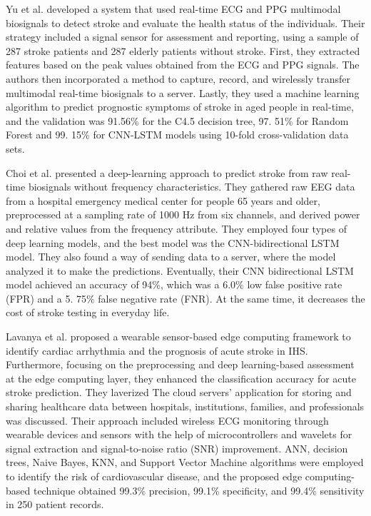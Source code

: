 \documentclass[conference]{IEEEtran}
\begin{document}
Yu et al. \cite{yu2022ai} developed a system that used real-time ECG and PPG multimodal biosignals to detect stroke and evaluate the health status of the individuals. Their strategy included a signal sensor for assessment and reporting, using a sample of 287 stroke patients and 287 elderly patients without stroke. First, they extracted features based on the peak values obtained from the ECG and PPG signals. The authors then incorporated a method to capture, record, and wirelessly transfer multimodal real-time biosignals to a server. Lastly, they used a machine learning algorithm to predict prognostic symptoms of stroke in aged people in real-time, and the validation was 91.56\% for the C4.5 decision tree, 97. 51\% for Random Forest and 99. 15\% for CNN-LSTM models using 10-fold cross-validation data sets.

Choi et al. \cite{choi2021deep} presented a deep-learning approach to predict stroke from raw real-time biosignals without frequency characteristics. They gathered raw EEG data from a hospital emergency medical center for people 65 years and older, preprocessed at a sampling rate of 1000 Hz from six channels, and derived power and relative values from the frequency attribute. They employed four types of deep learning models, and the best model was the CNN-bidirectional LSTM model. They also found a way of sending data to a server, where the model analyzed it to make the predictions. Eventually, their CNN bidirectional LSTM model achieved an accuracy of 94\%, which was a 6.0\% low false positive rate (FPR) and a 5. 75\% false negative rate (FNR). At the same time, it decreases the cost of stroke testing in everyday life.

Lavanya et al. \cite{lavanya2023wearable} proposed a wearable sensor-based edge computing framework to identify cardiac arrhythmia and the prognosis of acute stroke in IHS. Furthermore, focusing on the preprocessing and deep learning-based assessment at the edge computing layer, they enhanced the classification accuracy for acute stroke prediction. They laverized The cloud servers' application for storing and sharing healthcare data between hospitals, institutions, families, and professionals was discussed. Their approach included wireless ECG monitoring through wearable devices and sensors with the help of microcontrollers and wavelets for signal extraction and signal-to-noise ratio (SNR) improvement. ANN, decision trees, Naive Bayes, KNN, and Support Vector Machine algorithms were employed to identify the risk of cardiovascular disease, and the proposed edge computing-based technique obtained 99.3\% precision, 99.1\% specificity, and 99.4\% sensitivity in 250 patient records.
\end{document}
